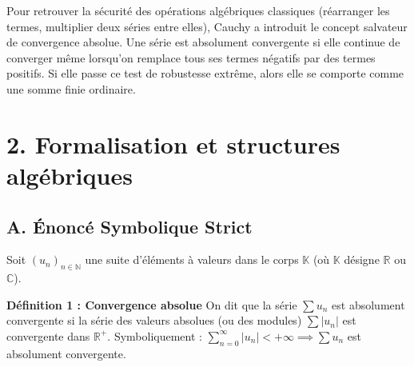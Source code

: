 \documentclass[12pt,a4paper]{report}
\begin{document}
Pour retrouver la sécurité des opérations algébriques classiques (réarranger les termes, multiplier deux séries entre elles), Cauchy a introduit le concept salvateur de convergence absolue. Une série est absolument convergente si elle continue de converger même lorsqu'on remplace tous ses termes négatifs par des termes positifs. Si elle passe ce test de robustesse extrême, alors elle se comporte comme une somme finie ordinaire.


\section{2. Formalisation et structures algébriques}


\begin{center}
\end{center}



\subsection{A. Énoncé Symbolique Strict}

Soit $(u_n)_{n \in \mathbb{N}}$ une suite d'éléments à valeurs dans le corps $\mathbb{K}$ (où $\mathbb{K}$ désigne $\mathbb{R}$ ou $\mathbb{C}$).

\textbf{Définition 1 : Convergence absolue}
On dit que la série $\sum u_n$ est absolument convergente si la série des valeurs absolues (ou des modules) $\sum |u_n|$ est convergente dans $\mathbb{R}^+$.
Symboliquement :
$\sum_{n=0}^\infty |u_n| < +\infty \implies \sum u_n$ est absolument convergente.
\end{document}

